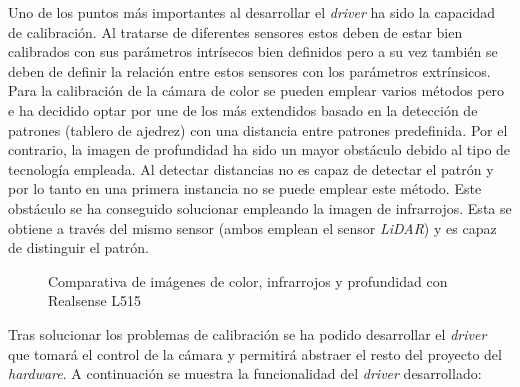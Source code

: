 Uno de los puntos más importantes al desarrollar el \textit{driver} ha sido la capacidad de calibración. Al tratarse de diferentes sensores estos deben de estar bien calibrados con sus parámetros intrísecos bien definidos pero a su vez también se deben de definir la relación entre estos sensores con los parámetros extrínsicos. Para la calibración de la cámara de color se pueden emplear varios métodos pero e ha decidido optar por une de los más extendidos basado en la detección de patrones (tablero de ajedrez) con una distancia entre patrones predefinida. Por el contrario, la imagen de profundidad ha sido un mayor obstáculo debido al tipo de tecnología empleada. Al detectar distancias no es capaz de detectar el patrón y por lo tanto en una primera instancia no se puede emplear este método. Este obstáculo se ha conseguido solucionar empleando la imagen de infrarrojos. Esta se obtiene a través del mismo sensor (ambos emplean el sensor \textit{LiDAR}) y es capaz de distinguir el patrón.

\begin{figure}[ht]
  \hfill	
  \hfill	
\caption{Comparativa de imágenes de color, infrarrojos y profundidad con Realsense L515}
\label{chap:Camara RGBD fig: Comparativa sensores}
\end{figure}

Tras solucionar los problemas de calibración se ha podido desarrollar el \textit{driver} que tomará el control de la cámara y permitirá abstraer el resto del proyecto del \textit{hardware}. A continuación se muestra la funcionalidad del \textit{driver} desarrollado:

